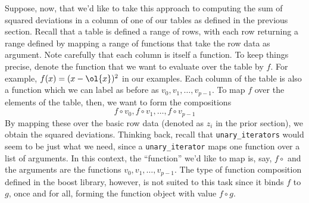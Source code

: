 \documentclass[12pt]{article}
\begin{document}
Suppose, now, that we'd like to take this approach to computing the
sum of squared deviations in a column of one of our tables as defined
in the previous section.  Recall that a table is defined a range of
rows, with each row returning a range defined by mapping a range of
functions that take the row data as argument.  Note carefully that
each column is itself a function.  To keep things precise, denote the
function that we want to evaluate over the table by $f$.  For example,
$f(x) = (x-\ol{x})^2$ in our examples.  Each column of the table is
also a function which we can label as before as
$v_0,v_1,\ldots,v_{p-1}$.  To map $f$ over the elements of the table,
then, we want to form the compositions
\begin{displaymath}
  f \circ v_0, f \circ v_1, \ldots, f \circ v_{p-1}
\end{displaymath}
By mapping these over the basic row data (denoted as $z_i$ in the
prior section), we obtain the squared deviations.  Thinking back,
recall that {\tt unary\_iterators} would seem to be just what we need,
since a {\tt unary\_iterator} maps one function over a list of
arguments.  In this context, the ``function'' we'd like to map is,
say, $f \circ$ and the arguments are the functions $v_0, v_1, \ldots,
v_{p-1}$.  The type of function composition defined in the boost
library, however, is not suited to this task since it binds $f$ to
$g$, once and for all, forming the function object with value $f \circ
g$. 
\end{document}
